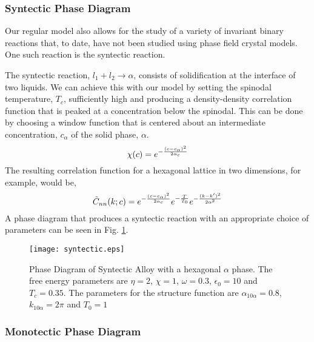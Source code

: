 \subsubsection{Syntectic Phase Diagram} %

Our regular model also allows for the study of a variety of invariant binary
reactions that, to date, have not been studied using phase field crystal
models. One such reaction is the syntectic reaction. 

The syntectic reaction, $l_1 + l_2 \rightarrow \alpha $, consists of
solidification at the interface of two liquids. We can achieve this with our
model by setting the spinodal temperature, $T_c$, sufficiently high and
producing a density-density correlation function that is peaked at a
concentration below the spinodal. This can be done by choosing a window
function that is centered about an intermediate concentration, $c_\alpha$ of
the solid phase, $\alpha$. 
%
\begin{equation}
  \chi(c) = e^{- \frac{(c - c_\alpha)^2}{2 \alpha_c}}
\end{equation}
%
The resulting correlation function for a hexagonal lattice in two dimensions,
for example, would be,
%
\begin{equation}
  \tilde{C}_{nn}(k; c) = 
    e^{-\frac{(c - c_\alpha)^2}{2 \alpha_c}}
    e^{-\frac{T}{T_0}} 
    e^{-\frac{(k - k^\prime)^2}{2\alpha^2}}
\end{equation}
%
A phase diagram that produces a syntectic reaction with an appropriate choice
of parameters can be seen in Fig. \ref{syntectic}.

\begin{figure}
    \centering
	\texttt{[image: syntectic.eps]}
    \caption[Syntectic Phase Diagram]{
        \label{syntectic} Phase Diagram of Syntectic Alloy with a hexagonal
        $\alpha$ phase. The free energy parameters are $\eta=2$, $\chi=1$,
        $\omega=0.3$, $\epsilon_0 = 10$ and $T_c=0.35$. The parameters for the
        structure function are $\alpha_{10\alpha} = 0.8$, $k_{10\alpha} = 2\pi$
        and $T_0 = 1$
    }
\end{figure}

\subsubsection{Monotectic Phase Diagram} %

